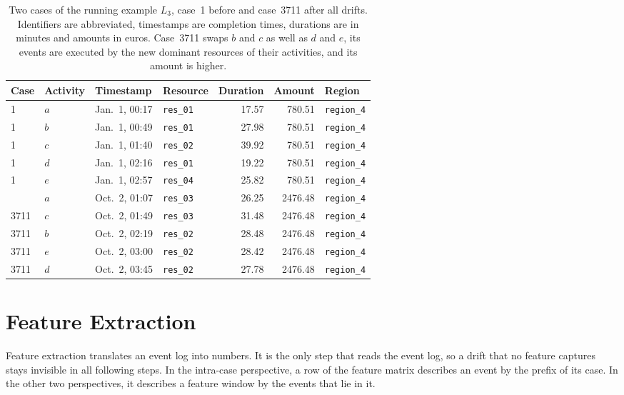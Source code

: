 \begin{table}[tb]
	\centering
	\caption[Excerpt of the running example]{%
		Two cases of the running example $L_3$, case~1 before and case~3711 after all drifts. Identifiers are abbreviated, timestamps are completion times, durations are in minutes and amounts in euros. Case~3711 swaps $b$ and $c$ as well as $d$ and $e$, its events are executed by the new dominant resources of their activities, and its amount is higher.}
	\label{tab:approach:running_log}
	\small
	\begin{tabular}{@{}llllrrl@{}}
		\toprule
		Case & Activity & Timestamp     & Resource         & Duration & Amount  & Region            \\
		\midrule
		1    & $a$      & Jan.~1, 00:17 & \texttt{res\_01} & 17.57    & 780.51  & \texttt{region\_4} \\
		1    & $b$      & Jan.~1, 00:49 & \texttt{res\_01} & 27.98    & 780.51  & \texttt{region\_4} \\
		1    & $c$      & Jan.~1, 01:40 & \texttt{res\_02} & 39.92    & 780.51  & \texttt{region\_4} \\
		1    & $d$      & Jan.~1, 02:16 & \texttt{res\_01} & 19.22    & 780.51  & \texttt{region\_4} \\
		1    & $e$      & Jan.~1, 02:57 & \texttt{res\_04} & 25.82    & 780.51  & \texttt{region\_4} \\
		\addlinespace
		3711 & $a$      & Oct.~2, 01:07 & \texttt{res\_03} & 26.25    & 2476.48 & \texttt{region\_4} \\
		3711 & $c$      & Oct.~2, 01:49 & \texttt{res\_03} & 31.48    & 2476.48 & \texttt{region\_4} \\
		3711 & $b$      & Oct.~2, 02:19 & \texttt{res\_02} & 28.48    & 2476.48 & \texttt{region\_4} \\
		3711 & $e$      & Oct.~2, 03:00 & \texttt{res\_02} & 28.42    & 2476.48 & \texttt{region\_4} \\
		3711 & $d$      & Oct.~2, 03:45 & \texttt{res\_02} & 27.78    & 2476.48 & \texttt{region\_4} \\
		\bottomrule
	\end{tabular}
\end{table}

\section{Feature Extraction}
\label{sec:approach:features}
Feature extraction translates an event log into numbers. It is the only step that reads the event log, so a drift that no feature captures stays invisible in all following steps. In the intra-case perspective, a row of the feature matrix describes an event by the prefix of its case. In the other two perspectives, it describes a feature window by the events that lie in it.

